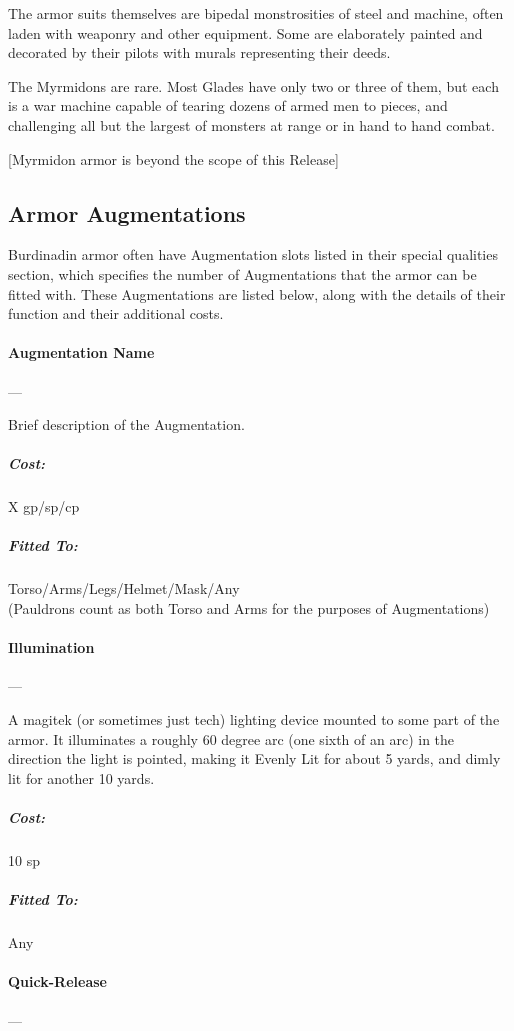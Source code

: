 \documentclass[oneside,11pt,english]{book}
\begin{document}
The armor suits themselves are bipedal monstrosities of steel and machine, often
laden with weaponry and other equipment. Some are elaborately painted and
decorated by their pilots with murals representing their deeds. 

The Myrmidons are rare. Most Glades have only two or three of them, but each is
a war machine capable of tearing dozens of armed men to pieces, and challenging
all but the largest of monsters at range or in hand to hand combat.

[Myrmidon armor is beyond the scope of this Release] 

\subsection{Armor Augmentations}
Burdinadin armor often have Augmentation slots listed in their special qualities
section, which specifies the number of Augmentations that the armor can be
fitted with. These Augmentations are listed below, along with the details of
their function and their additional costs.

\paragraph{Augmentation Name}---

Brief description of the Augmentation.
\vspace{-15pt}\subparagraph{Cost:} X gp/sp/cp
\vspace{-15pt}\subparagraph{Fitted To:} Torso/Arms/Legs/Helmet/Mask/Any\\ (Pauldrons count as both Torso and Arms for the purposes of Augmentations)

\paragraph{Illumination}---\quad[0]

A magitek (or sometimes just tech) lighting device mounted to some part of the
armor. It illuminates a roughly 60 degree arc (one sixth of an arc) in the
direction the light is pointed, making it Evenly Lit for about 5 yards, and
dimly lit for another 10 yards.
\vspace{-15pt}\subparagraph{Cost:} 10 sp
\vspace{-15pt}\subparagraph{Fitted To:} Any

\paragraph{Quick-Release}---\quad[0]
\end{document}
